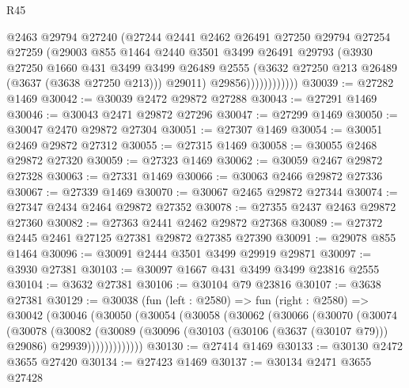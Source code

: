 \begin{lexlean}{R45}
\begin{coremodule}
                        @2463
                        @29794
                        @27240
                        (@27244
                          @2441
                          @2462
                          @26491
                          @27250
                          @29794
                          @27254
                          @27259
                          (@29003
                            @855
                            @1464
                            @2440
                            @3501
                            @3499
                            @26491
                            @29793
                            (@3930
                              @27250
                              @1660
                              @431
                              @3499
                              @3499
                              @26489
                              @2555
                              (@3632 @27250 @213 @26489 (@3637 (@3638 @27250 @213)))
                              @29011)
                            @29856))))))))))))
@30039 := @27282 @1469
@30042 := @30039 @2472 @29872 @27288
@30043 := @27291 @1469
@30046 := @30043 @2471 @29872 @27296
@30047 := @27299 @1469
@30050 := @30047 @2470 @29872 @27304
@30051 := @27307 @1469
@30054 := @30051 @2469 @29872 @27312
@30055 := @27315 @1469
@30058 := @30055 @2468 @29872 @27320
@30059 := @27323 @1469
@30062 := @30059 @2467 @29872 @27328
@30063 := @27331 @1469
@30066 := @30063 @2466 @29872 @27336
@30067 := @27339 @1469
@30070 := @30067 @2465 @29872 @27344
@30074 := @27347 @2434 @2464 @29872 @27352
@30078 := @27355 @2437 @2463 @29872 @27360
@30082 := @27363 @2441 @2462 @29872 @27368
@30089 := @27372 @2445 @2461 @27125 @27381 @29872 @27385 @27390
@30091 := @29078 @855 @1464
@30096 := @30091 @2444 @3501 @3499 @29919 @29871
@30097 := @3930 @27381
@30103 := @30097 @1667 @431 @3499 @3499 @23816 @2555
@30104 := @3632 @27381
@30106 := @30104 @79 @23816
@30107 := @3638 @27381
@30129 := @30038
    (fun (left : @2580) =>
    fun (right : @2580) =>
    @30042
      (@30046
        (@30050
          (@30054
            (@30058
              (@30062
                (@30066
                  (@30070
                    (@30074
                      (@30078
                        (@30082
                          (@30089
                            (@30096
                              (@30103 (@30106 (@3637 (@30107 @79))) @29086)
                              @29939)))))))))))))
@30130 := @27414 @1469
@30133 := @30130 @2472 @3655 @27420
@30134 := @27423 @1469
@30137 := @30134 @2471 @3655 @27428

\end{coremodule}
\end{lexlean}
